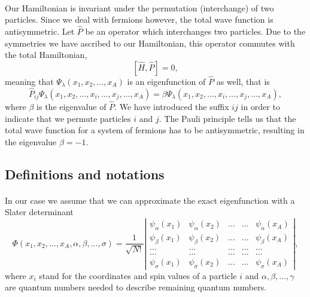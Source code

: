 \documentclass[%
twoside,                 %
final,                   %
10pt]{article}
\begin{document}
\paragraph{}
Our Hamiltonian is invariant under the permutation (interchange) of two particles.
Since we deal with fermions however, the total wave function is antisymmetric.
Let $\hat{P}$ be an operator which interchanges two particles.
Due to the symmetries we have ascribed to our Hamiltonian, this operator commutes with the total Hamiltonian,
\[
[\hat{H},\hat{P}] = 0,
 \]
meaning that $\Psi_{\lambda}(x_1, x_2, \dots , x_A)$ is an eigenfunction of 
$\hat{P}$ as well, that is
\[
\hat{P}_{ij}\Psi_{\lambda}(x_1, x_2, \dots,x_i,\dots,x_j,\dots,x_A)=
\beta\Psi_{\lambda}(x_1, x_2, \dots,x_i,\dots,x_j,\dots,x_A),
\]
where $\beta$ is the eigenvalue of $\hat{P}$. We have introduced the suffix $ij$ in order to indicate that we permute particles $i$ and $j$.
The Pauli principle tells us that the total wave function for a system of fermions
has to be antisymmetric, resulting in the eigenvalue $\beta = -1$.



\subsection{Definitions and notations}

\paragraph{}
In our case we assume that  we can approximate the exact eigenfunction with a Slater determinant
\begin{equation}
   \Phi(x_1, x_2,\dots ,x_A,\alpha,\beta,\dots, \sigma)=\frac{1}{\sqrt{N!}}
\left| \begin{array}{ccccc} \psi_{\alpha}(x_1)& \psi_{\alpha}(x_2)& \dots & \dots & \psi_{\alpha}(x_A)\\
                            \psi_{\beta}(x_1)&\psi_{\beta}(x_2)& \dots & \dots & \psi_{\beta}(x_A)\\  
                            \dots & \dots & \dots & \dots & \dots \\
                            \dots & \dots & \dots & \dots & \dots \\
                     \psi_{\sigma}(x_1)&\psi_{\sigma}(x_2)& \dots & \dots & \psi_{\sigma}(x_A)\end{array} \right|, \label{eq:HartreeFockDet}
\end{equation}
where  $x_i$  stand for the coordinates and spin values of a particle $i$ and $\alpha,\beta,\dots, \gamma$ 
are quantum numbers needed to describe remaining quantum numbers.
\end{document}
